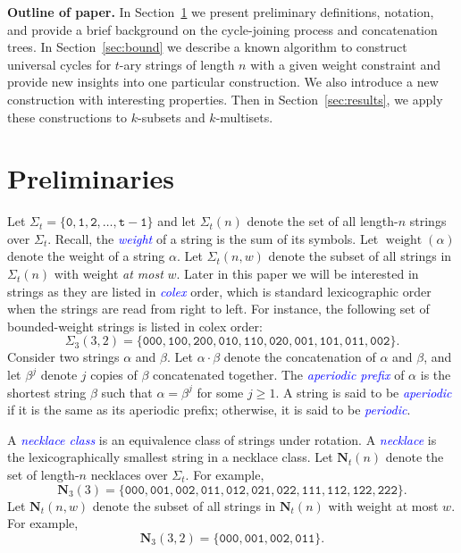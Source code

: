 \documentclass[US-letter,USenglish,authorcolumns,autoref]{lipics-v2021}
\renewcommand{\tt} {\mathtt}
\newcommand{\bN}{\mathbf{N}}
\newcommand{\defo}[1] {\emph{\textcolor{blue}{#1}}}
\DeclareMathOperator{\wt}{weight}
\begin{document}
\bigskip

\noindent
{\bf Outline of paper.}
In Section~\ref{sec:back} we present preliminary definitions, notation, and provide a brief background on the cycle-joining process and concatenation trees.  In Section~\ref{sec:bound} we describe a known algorithm to construct universal cycles for $t$-ary strings of length $n$ with a given weight constraint and provide new insights into one particular construction. We also introduce a new construction with interesting properties.  Then in Section~\ref{sec:results}, we apply these constructions to $k$-subsets and $k$-multisets.  



\section{Preliminaries} \label{sec:back}

Let $\Sigma_t = \{\tt{0,1,2},\ldots, \tt{t{-}1}\}$ and let $\Sigma_t(n)$ denote the set of all length-$n$ strings over $\Sigma_t$.  Recall, the \defo{weight} of a string is the sum of its symbols. Let $\wt(\alpha)$ denote the weight of a string $\alpha$. 
Let $\Sigma_t(n,w)$ denote the subset of all strings in $\Sigma_t(n)$ with weight \emph{at most} $w$.   Later in this paper we will be interested in strings as they are listed in \defo{colex} order, which is standard lexicographic order when the strings are read from right to left. For instance, the following set of bounded-weight strings is listed in colex order:
\[ \Sigma_3(3,2) = \{\tt{000, 100, 200, 010, 110, 020, 001, 101, 011, 002}\}.\]
Consider two strings $\alpha$ and $\beta$.
Let  $\alpha \cdot \beta$ denote the  concatenation of $\alpha$ and $\beta$, and   let $\beta^j$ denote $j$ copies of $\beta$ concatenated together.
The \defo{aperiodic prefix} of $\alpha$ is the shortest string $\beta$ such that $\alpha = \beta^j$ for some $j \geq 1$.
A string is said to be \defo{aperiodic} if it is the same as its aperiodic prefix; otherwise, it is said to be \defo{periodic}.


%

A \defo{necklace class} is an equivalence class of strings under rotation.
A \defo{necklace} is the lexicographically smallest string in a necklace class.   Let $\bN_t(n)$ denote the set of length-$n$ necklaces over $\Sigma_t$.  For example, 
\[ \bN_3(3) = \{\tt{000, 001, 002, 011, 012, 021, 022, 111,112,122, 222} \}. \]
Let $\bN_t(n,w)$ denote the subset of all strings in $\bN_t(n)$ with weight at most $w$.  For example, 
\[ \bN_3(3,2) = \{\tt{000, 001, 002, 011} \}. \]
%
  
\end{document}
